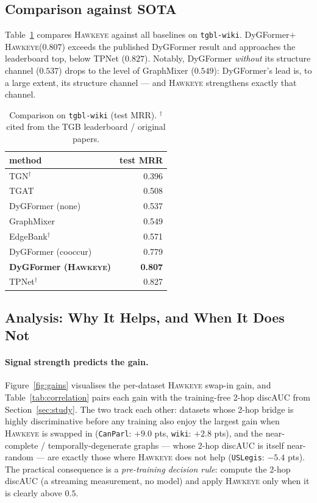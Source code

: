 \documentclass[sigconf,nonacm,review]{acmart}
\newcommand{\method}{\textsc{Hawkeye}\xspace}
\begin{document}
\subsection{Comparison against SOTA}
Table~\ref{tab:sota} compares \method against all baselines on
\texttt{tgbl-wiki}. DyGFormer$+$\method ($0.807$) exceeds the published
DyGFormer result and approaches the leaderboard top, below TPNet ($0.827$).
Notably, DyGFormer \emph{without} its structure channel ($0.537$) drops to the
level of GraphMixer ($0.549$): DyGFormer's lead is, to a large extent, its
structure channel --- and \method strengthens exactly that channel.

\begin{table}[t]
\caption{Comparison on \texttt{tgbl-wiki} (test MRR). $^{\dagger}$cited from
the TGB leaderboard / original papers.}
\label{tab:sota}
\centering\small
\begin{tabular}{lr}
\toprule
method & test MRR \\
\midrule
TGN$^{\dagger}$            & 0.396 \\
TGAT                       & 0.508 \\
DyGFormer (none)           & 0.537 \\
GraphMixer                 & 0.549 \\
EdgeBank$^{\dagger}$       & 0.571 \\
DyGFormer (cooccur)        & 0.779 \\
\textbf{DyGFormer (\method)} & \textbf{0.807} \\
TPNet$^{\dagger}$          & 0.827 \\
\bottomrule
\end{tabular}
\end{table}

\subsection{Analysis: Why It Helps, and When It Does Not}
\label{sec:analysis}

\paragraph{Signal strength predicts the gain.}
Figure~\ref{fig:gains} visualises the per-dataset \method swap-in gain, and
Table~\ref{tab:correlation} pairs each gain with the training-free 2-hop
discAUC from Section~\ref{sec:study}. The two track each other: datasets
whose 2-hop bridge is highly discriminative before any training also enjoy
the largest gain when \method is swapped in (\texttt{CanParl}: $+9.0$ pts,
\texttt{wiki}: $+2.8$ pts), and the near-complete / temporally-degenerate
graphs --- whose 2-hop discAUC is itself near-random --- are exactly those
where \method does not help (\texttt{USLegis}: $-5.4$ pts). The practical
consequence is a \emph{pre-training decision rule}: compute the 2-hop
discAUC (a streaming measurement, no model) and apply \method only when it
is clearly above $0.5$.
\end{document}
